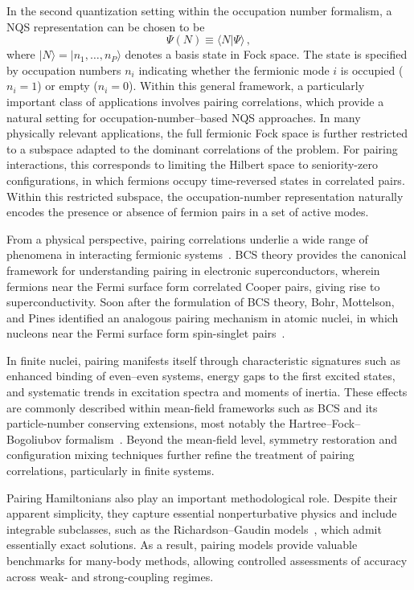 In the second quantization setting within the occupation number formalism, a NQS representation can be chosen to be
\begin{equation}
\Psi(N) \equiv \langle N | \Psi \rangle\,,
\end{equation}
where $|N\rangle = |n_1,\dots,n_P\rangle$ denotes a basis state in Fock space. The state is specified by occupation numbers $n_i$ indicating whether the fermionic mode $i$ is occupied ($n_i=1$) or empty ($n_i=0$).
Within this general framework, a particularly important class of applications involves pairing correlations, which provide a natural setting for occupation-number--based NQS approaches.
In many physically relevant applications, the full fermionic Fock space is further restricted to a subspace adapted to the dominant correlations of the problem.
For pairing interactions, this corresponds to limiting the Hilbert space to seniority-zero configurations, in which fermions occupy time-reversed states in correlated pairs.
Within this restricted subspace, the occupation-number representation naturally encodes the presence or absence of fermion pairs in a set of active modes.

From a physical perspective, pairing correlations underlie a wide range of phenomena in interacting fermionic systems~\cite{bohr_possible_1958,ring_nuclear_1980,dean_pairing_2003}.
BCS theory provides the canonical framework for understanding pairing in electronic superconductors, wherein fermions near the Fermi surface form correlated Cooper pairs, giving rise to superconductivity.
Soon after the formulation of BCS theory, Bohr, Mottelson, and Pines identified an analogous pairing mechanism in atomic nuclei, in which nucleons near the Fermi surface form spin-singlet pairs~\cite{bohr_possible_1958}.

In finite nuclei, pairing manifests itself through characteristic signatures such as enhanced binding of even--even systems, energy gaps to the first excited states, and systematic trends in excitation spectra and moments of inertia.
These effects are commonly described within mean-field frameworks such as BCS and its particle-number conserving extensions, most notably the Hartree--Fock--Bogoliubov formalism~\cite{dobaczewski_pairing_2001}.
Beyond the mean-field level, symmetry restoration and configuration mixing techniques further refine the treatment of pairing correlations, particularly in finite systems.

Pairing Hamiltonians also play an important methodological role.
Despite their apparent simplicity, they capture essential nonperturbative physics and include integrable subclasses, such as the Richardson--Gaudin models~\cite{richardson_restricted_1963,richardson_application_1963,gaudin_diagonalisation_1976}, which admit essentially exact solutions.
As a result, pairing models provide valuable benchmarks for many-body methods, allowing controlled assessments of accuracy across weak- and strong-coupling regimes.

